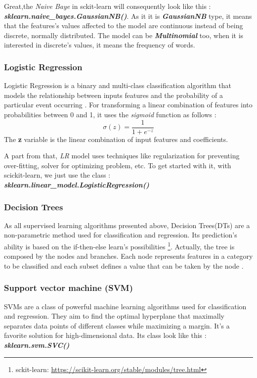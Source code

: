 \documentclass[12pt,a4paper, oneside]{book}
\begin{document}
Great,the \textit{Naive Baye} in sckit-learn will consequently look like this : \newline
\textbf{\textit{sklearn.naive\_bayes.GaussianNB()}}. As it it is \textbf{\textit{GaussianNB}} type, it means that the features's values affected to the model are continuous instead of being discrete, normally distributed. The model can be \textbf{\textit{Multinomial}} too, when it is interested in discrete's values, it means the frequency of words.
\subsubsection{Logistic Regression} 
Logistic Regression is a binary and multi-class classification algorithm that models the relationship between inputs features and the probability of a particular event occurring \cite{rymarczyk2019logistic}. For transforming a linear combination of features into probabilities between 0 and 1, it uses the \textit{sigmoid} function as follows :
\begin{equation} 
\label{sigmoidFunction}
\sigma(z) = \frac{1}{1 + e^{-z}}
\end{equation} 
The \textbf{z} variable is the linear combination of input features and coefficients. 

A part from that, \textit{LR} model uses techniques like regularization for preventing over-fitting, solver for optimizing problem, etc.
To get started with it, with scickit-learn, we just use the class :
\textbf{\textit{sklearn.linear\_model.LogisticRegression()}} 

\subsubsection{Decision Trees} 
As all supervised learning algorithms presented above, Decision Trees(DTs) are a non-parametric method used for classification and regression. Its prediction's ability is based on the if-then-else learn's possibilities \footnote{sckit-learn: \url{https://scikit-learn.org/stable/modules/tree.html} }. Actually, the tree is composed by the nodes and branches. Each node represents features in a category to be classified and each subset defines a value that can be taken by the node \cite{charbuty2021classification}.  
\subsubsection{Support vector machine (SVM)} 
SVMs are a class of powerful machine learning algorithms used for classification and regression. They aim to find the optimal hyperplane that maximally separates data points of different classes while maximizing a margin. It's a favorite solution for high-dimensional data\cite{memoireUniversitySpam}. Its class look like this : \textbf{\textit{sklearn.svm.SVC()}}
\end{document}
